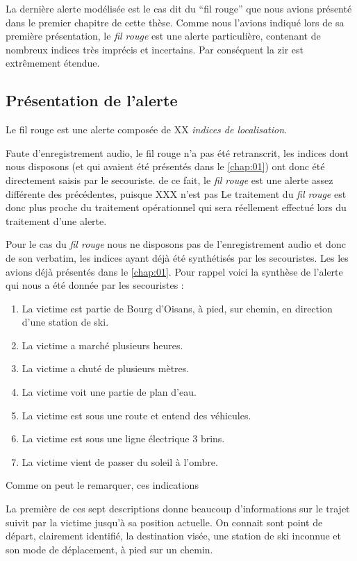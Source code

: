 
La dernière alerte modélisée est le cas dit du \enquote{fil rouge} que
nous avions présenté dans le premier chapitre de cette thèse. Comme
nous l'avions indiqué lors de sa première présentation, le \emph{fil
  rouge} est une alerte particulière, contenant de nombreux indices
très imprécis et incertains. Par conséquent la \ac{zir} est
extrêmement étendue.


\subsection{Présentation de l'alerte}
\label{subsec:9-4-1}

Le fil rouge est une alerte composée de XX \emph{indices de
  localisation.}


Faute d'enregistrement audio, le fil rouge n'a pas été retranscrit,
les indices dont nous disposons (et qui avaient été présentés dans le
\autoref{chap:01}) ont donc été directement saisis par le secouriste.
%
de ce fait, le \emph{fil rouge} est une alerte assez différente des
précédentes, puisque XXX n'est pas
%
Le traitement du \emph{fil rouge} est donc plus proche du traitement
opérationnel qui sera réellement effectué lors du traitement d'une
alerte.


Pour le cas du \emph{fil rouge} nous ne disposons pas de
l'enregistrement audio et donc de son verbatim, les indices ayant déjà 
été synthétisés par les secouristes. Les les avions déjà présentés
dans le \autoref{chap:01}.
%
Pour rappel voici la synthèse de l'alerte qui nous a été donnée par
les secouristes :
%
\begin{enumerate}
\item La victime est partie de Bourg d'Oisans, à pied, sur chemin, en
  direction d'une station de ski.
\item La victime a marché plusieurs heures.
\item La victime a chuté de plusieurs mètres.
\item La victime voit une partie de plan d'eau.
\item La victime est sous une route et entend des véhicules.
\item La victime est sous une ligne électrique 3 brins.
\item La victime vient de passer du soleil à l'ombre.
\end{enumerate}


Comme on peut le remarquer, ces indications 

La première de ces sept descriptions donne beaucoup d'informations sur
le trajet suivit par la victime jusqu'à sa position actuelle. On
connait sont point de départ, clairement identifié, la destination
visée, une station de ski inconnue et son mode de déplacement, à pied
sur un chemin. 

